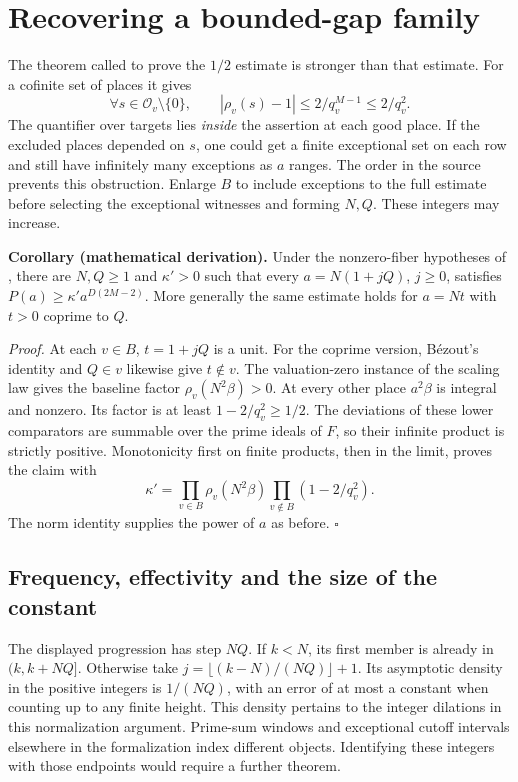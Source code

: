 \documentclass[12pt,letterpaper]{article}
\newcommand{\code}[1]{\texttt{\detokenize{#1}}}
\begin{document}
\clearpage\section{Recovering a bounded-gap family}
The theorem called to prove the \(1/2\) estimate is stronger than that estimate. For a cofinite set of places it gives
\[
 \forall s\in\mathcal O_v\setminus\{0\},\qquad
          |\rho_v(s)-1|\le 2/q_v^{M-1}\le 2/q_v^2.
\]
The quantifier over targets lies \emph{inside} the assertion at each good place. If the excluded places depended on \(s\), one could get a finite exceptional set on each row and still have infinitely many exceptions as \(a\) ranges. The order in the source prevents this obstruction. Enlarge \(B\) to include exceptions to the full estimate before selecting the exceptional witnesses and forming \(N,Q\). These integers may increase.

\textbf{Corollary (mathematical derivation).} Under the nonzero-fiber hypotheses of \code{growth_main}, there are \(N,Q\ge1\) and \(\kappa'>0\) such that every \(a=N(1+jQ)\), \(j\ge0\), satisfies \(P(a)\ge\kappa'a^{D(2M-2)}\). More generally the same estimate holds for \(a=Nt\) with \(t>0\) coprime to \(Q\).

\textit{Proof.} At each \(v\in B\), \(t=1+jQ\) is a unit. For the coprime version, Bézout's identity and \(Q\in v\) likewise give \(t\notin v\). The valuation-zero instance of the scaling law gives the baseline factor \(\rho_v(N^2\beta)>0\). At every other place \(a^2\beta\) is integral and nonzero. Its factor is at least \(1-2/q_v^2\ge1/2\). The deviations of these lower comparators are summable over the prime ideals of \(F\), so their infinite product is strictly positive. Monotonicity first on finite products, then in the limit, proves the claim with
\[
  \kappa'=\prod_{v\in B}\rho_v(N^2\beta)
                   \prod_{v\notin B}(1-2/q_v^2).
\]
The norm identity supplies the power of \(a\) as before. \(\square\)

\clearpage\subsection{Frequency, effectivity and the size of the constant}
The displayed progression has step \(NQ\). If \(k<N\), its first member is already in \((k,k+NQ]\). Otherwise take \(j=\lfloor(k-N)/(NQ)\rfloor+1\). Its asymptotic density in the positive integers is \(1/(NQ)\), with an error of at most a constant when counting up to any finite height. This density pertains to the integer dilations in this normalization argument. Prime-sum windows and exceptional cutoff intervals elsewhere in the formalization index different objects. Identifying these integers with those endpoints would require a further theorem.
\end{document}
